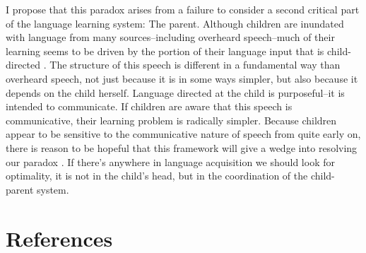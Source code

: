 \documentclass[review]{elsarticle}
\begin{document}
I propose that this paradox arises from a failure to consider a second critical part of the language learning system: The parent. Although children are inundated with language from many sources--including overheard speech--much of their learning seems to be driven by the portion of their language input that is child-directed \citep{weisleder2013}. The structure of this speech is different in a fundamental way than overheard speech, not just because it is in some ways simpler, but also because it depends on the child herself. Language directed at the child is purposeful--it is intended to communicate. If children are aware that this speech is communicative, their learning problem is radically simpler. Because children appear to be sensitive to the communicative nature of speech from quite early on, there is reason to be hopeful that this framework will give a wedge into resolving our paradox \citep{vouloumanos2012,vouloumanos2014}. If there's anywhere in language acquisition we should look for optimality, it is not in the child's head, but in the coordination of the child-parent system.

\section*{References}


\end{document}
